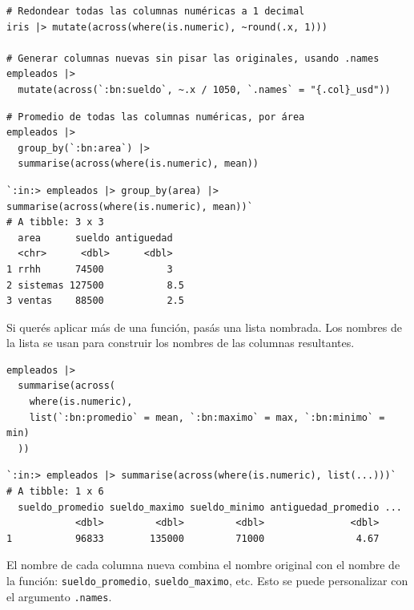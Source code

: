 \documentclass[8pt]{beamer}
\begin{document}
	\begin{frame}[fragile]
\begin{lstlisting}[style=RScript]
# Redondear todas las columnas numéricas a 1 decimal
iris |> mutate(across(where(is.numeric), ~round(.x, 1)))

# Generar columnas nuevas sin pisar las originales, usando .names
empleados |>
  mutate(across(`:bn:sueldo`, ~.x / 1050, `.names` = "{.col}_usd"))
\end{lstlisting}

\begin{lstlisting}[style=RScript]
# Promedio de todas las columnas numéricas, por área
empleados |>
  group_by(`:bn:area`) |>
  summarise(across(where(is.numeric), mean))
\end{lstlisting}
\begin{lstlisting}[style=RConsole]
`:in:> empleados |> group_by(area) |> summarise(across(where(is.numeric), mean))`
# A tibble: 3 x 3
  area      sueldo antiguedad
  <chr>      <dbl>      <dbl>
1 rrhh      74500           3
2 sistemas 127500           8.5
3 ventas    88500           2.5
\end{lstlisting}
	\end{frame}


	\begin{frame}[fragile]
		Si querés aplicar más de una función, pasás una lista nombrada. Los nombres de la lista se usan para construir los nombres de las columnas resultantes.

\begin{lstlisting}[style=RScript]
empleados |>
  summarise(across(
    where(is.numeric),
    list(`:bn:promedio` = mean, `:bn:maximo` = max, `:bn:minimo` = min)
  ))
\end{lstlisting}
\begin{lstlisting}[style=RConsole]
`:in:> empleados |> summarise(across(where(is.numeric), list(...)))`
# A tibble: 1 x 6
  sueldo_promedio sueldo_maximo sueldo_minimo antiguedad_promedio ...
            <dbl>         <dbl>         <dbl>               <dbl>
1           96833        135000         71000                4.67
\end{lstlisting}

		\begin{block}{}
			El nombre de cada columna nueva combina el nombre original con el nombre de la función: \texttt{sueldo\_promedio}, \texttt{sueldo\_maximo}, etc. Esto se puede personalizar con el argumento \texttt{.names}.
		\end{block}
	\end{frame}
\end{document}
